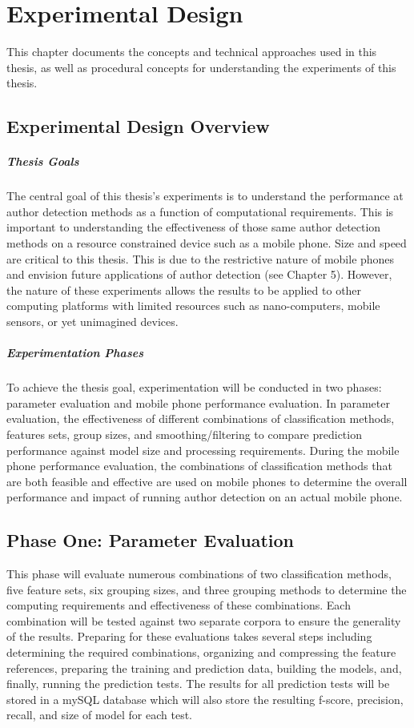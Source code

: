\chapter{Experimental Design}
This chapter documents the concepts and technical approaches used in this thesis, as well as procedural concepts for understanding the experiments of this thesis.

\section{Experimental Design Overview}
	\paragraph{Thesis Goals} The central goal of this thesis's experiments is to understand the performance at author detection methods as a function of computational requirements. This is important to understanding the effectiveness of those same author detection methods on a resource constrained device such as a mobile phone.  Size and speed are critical to this thesis. This is due to the restrictive nature of mobile phones and envision future applications of author detection (see Chapter 5).  However, the nature of these experiments allows the results to be applied to other computing platforms with limited resources such as nano-computers, mobile sensors, or yet unimagined devices.
	\paragraph{Experimentation Phases}To achieve the thesis goal, experimentation will be conducted in two phases: parameter evaluation and mobile phone performance evaluation.  In parameter evaluation, the effectiveness of different combinations of classification methods, features sets, group sizes, and smoothing/filtering to compare prediction performance against model size and processing requirements.  During the mobile phone performance evaluation, the combinations of classification methods that are both feasible and effective are used on mobile phones to determine the overall performance and impact of running author detection on an actual mobile phone.

\section{Phase One: Parameter Evaluation} This phase will evaluate numerous combinations of two classification methods, five feature sets, six grouping sizes, and three grouping methods to determine the computing requirements and effectiveness of these combinations.  Each combination will be tested against two separate corpora to ensure the generality of the results. Preparing for these evaluations takes several steps including determining the required combinations, organizing and compressing the feature references, preparing the training and prediction data, building the models, and, finally, running the prediction tests.  The results for all prediction tests will be stored in a mySQL database which will also store the resulting f-score, precision, recall, and size of model for each test.

